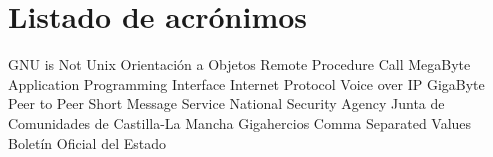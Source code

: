 \chapter{Listado de acrónimos}

{\small
\begin{acronym}[XXXXXXXX]
       {\acs{GNU} is Not Unix}
        {Orientación a Objetos}
       {Remote Procedure Call}
        {MegaByte}
       {Application Programming Interface}
        {Internet Protocol}
      {Voice over \acs{IP}}
        {GigaByte}
       {Peer to Peer}
       {Short Message Service}
       {National Security Agency}
      {Junta de Comunidades de Castilla-La Mancha}
  	 {Gigahercios}
       {Comma Separated Values}
       {Boletín Oficial del Estado}
\end{acronym}
}




